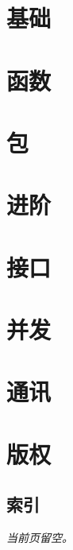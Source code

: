 \documentclass[a4paper,twoside,openleft]{blocksbook}
\begin{document}
\begin{cjk}
\chapter{基础}
\label{chap:basics}


\chapter{函数}
\label{chap:functions}


\chapter{包}
\label{chap:packages}


\chapter{进阶}
\label{chap:beyond}


\chapter{接口}
\label{chap:interfaces}


\chapter{并发}
\label{chap:channels}


\chapter{通讯}
\label{chap:communication}



\appendix

\chapter{版权}


\begin{twocolumn}
\chapter{索引}
\printindex
\end{twocolumn}
\begin{onecolumn}



\newpage
\thispagestyle{empty}
\begin{center}
\emph{当前页留空。}
\end{center}
\end{onecolumn}
\end{cjk}
\end{document}
